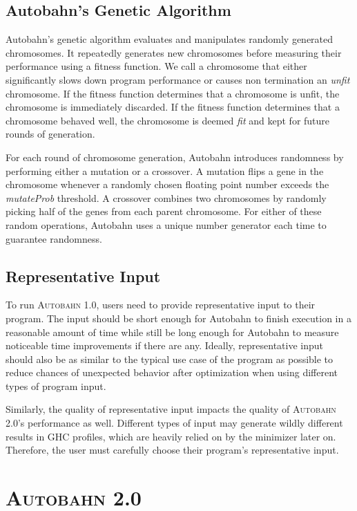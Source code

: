 \documentclass[format=sigplan, review=true]{acmart}
\newcommand{\unfit}[0]{unfit}
\newcommand{\Ao}[0]{\textsc{Autobahn 1.0}}
\newcommand{\At}[0]{\textsc{Autobahn 2.0}}
\newcommand{\fit}[0]{\textit{fit}}
\begin{document}
\subsection{Autobahn's Genetic Algorithm}

Autobahn's genetic algorithm evaluates and manipulates randomly generated chromosomes. It repeatedly generates new chromosomes before measuring their performance using a fitness function. We call a chromosome that either significantly slows down program performance or causes non termination an \textit{\unfit{}} chromosome. If the fitness function determines that a chromosome is \unfit{}, the chromosome is immediately discarded. If the fitness function determines that a chromosome behaved well, the chromosome is deemed \textit{\fit{}} and kept for future rounds of generation. 

For each round of chromosome generation, Autobahn introduces randomness by performing either a mutation or a crossover. A mutation flips a gene in the chromosome whenever a randomly chosen floating point number exceeds the \textit{mutateProb} threshold. A crossover combines two chromosomes by randomly picking half of the genes from each parent chromosome. For either of these random operations, Autobahn uses a unique number generator each time to guarantee randomness. 

\subsection{Representative Input}

To run \Ao{}, users need to provide representative input to their program. The input should be short enough for Autobahn to finish execution in a reasonable amount of time while still be long enough for Autobahn to measure noticeable time improvements if there are any. Ideally, representative input should also be as similar to the typical use case of the program as possible to reduce chances of unexpected behavior after optimization when using different types of program input.

Similarly, the quality of representative input impacts the quality of \At{}'s performance as well. Different types of input may generate wildly different results in GHC profiles, which are heavily relied on by the minimizer later on. Therefore, the user must carefully choose their program's representative input.

\section{\At{}}
\end{document}
